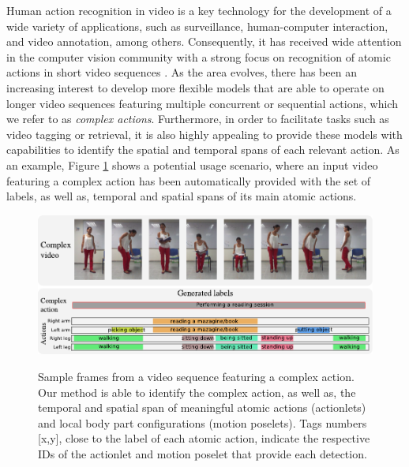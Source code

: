 Human action recognition in video is a key technology for the development of a
wide variety of applications, such as surveillance, human-computer interaction,
and video annotation, among others. Consequently, it has received wide attention
in the computer vision community with a strong focus on recognition of atomic
actions in short video sequences
\cite{Aggarwal2011,Poppe2010,vishwakarma2013survey,weinland2011survey}.
As the area
evolves, there has been an increasing interest to develop more
flexible models that are able to operate on longer video sequences featuring
multiple concurrent or sequential actions, which we refer to as
\textit{complex actions}. Furthermore, in order to facilitate tasks such as
video tagging or retrieval, it is also highly appealing to provide these models
with capabilities to identify the spatial and temporal spans of each relevant
action. As an example, Figure \ref{fig:frontfigure} shows a potential usage
scenario, where an input video featuring a complex action has been automatically
provided with the set of labels, as well as, temporal and
spatial spans of its main atomic actions.

\begin{figure}[t]
\begin{center} \label{fig:frontfigure}
\includegraphics[width=0.98\linewidth]{Fig/portada.pdf}
\vspace{-0.5cm}
\end{center}
\caption{Sample frames from a video sequence featuring a complex action. 
Our method is able to identify the complex action, as well as, the temporal and 
spatial span of meaningful atomic actions (actionlets) and local body part 
configurations (motion poselets). Tags numbers [x,y], close to the label of 
each atomic action, indicate the respective IDs of the actionlet and motion 
poselet that provide each detection.}
\vspace{-0.5cm}
\end{figure}

